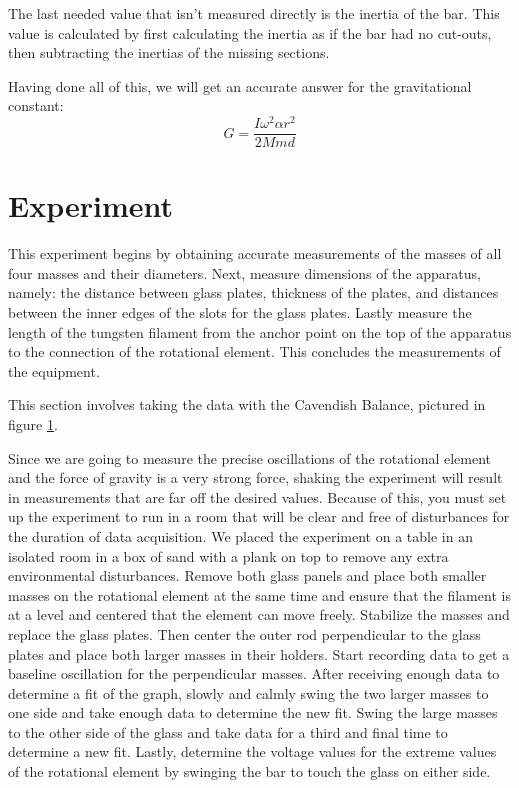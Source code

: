 \documentclass[aps,prl,10pt,twocolumn,floatfix]{revtex4-2}
\begin{document}
The last needed value that isn't measured directly is the inertia of the bar. 
This value is calculated by first calculating the inertia as if the bar had no cut-outs, then subtracting the inertias of the missing sections. 

Having done all of this, we will get an accurate answer for the gravitational constant:
\begin{equation}
G=\frac{I\omega^2\alpha r^2}{2M m d}
\end{equation}

\section{Experiment}
This experiment begins by obtaining accurate measurements of the masses of all four masses and their diameters. 
Next, measure dimensions of the apparatus, namely: the distance between glass plates, thickness of the plates, and distances between the inner edges of the slots for the glass plates.
Lastly measure the length of the tungsten filament from the anchor point on the top of the apparatus to the connection of the rotational element. 
This concludes the measurements of the equipment. 

This section involves taking the data with the Cavendish Balance, pictured in figure \ref{bal}.

\begin{figure}\label{bal}

\end{figure}

Since we are going to measure the precise oscillations of the rotational element and the force of gravity is a very strong force, shaking the experiment will result in measurements that are far off the desired values. 
Because of this, you must set up the experiment to run in a room that will be clear and free of disturbances for the duration of data acquisition.
We placed the experiment on a table in an isolated room in a box of sand with a plank on top to remove any extra environmental disturbances.  
Remove both glass panels and place both smaller masses on the rotational element at the same time and ensure that the filament is at a level and centered that the element can move freely. 
Stabilize the masses and replace the glass plates.
Then center the outer rod perpendicular to the glass plates and place both larger masses in their holders.
Start recording data to get a baseline oscillation for the perpendicular masses.
After receiving enough data to determine a fit of the graph, slowly and calmly swing the two larger masses to one side and take enough data to determine the new fit.
Swing the large masses to the other side of the glass and take data for a third and final time to determine a new fit. 
Lastly, determine the voltage values for the extreme values of the rotational element by swinging the bar to touch the glass on either side. 
\end{document}
